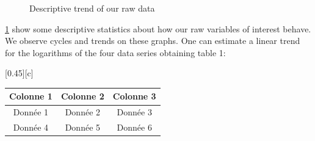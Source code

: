 \documentclass[12pt]{article}
\begin{document}
\begin{figure}
    \caption{Descriptive trend of our raw data}
    \label{fig:descriptive}
  \end{figure}

\ref{fig:descriptive} show some descriptive statistics about how our raw variables of interest behave. 
We observe cycles and trends on these graphs. One can estimate a linear trend for the logarithms of the four data series obtaining table 1:



[0.45\textwidth][c]{%
\begin{tabular}{ccc}
  \toprule
  Colonne 1 & Colonne 2 & Colonne 3 \\
  \midrule
  Donnée 1 & Donnée 2 & Donnée 3 \\
  Donnée 4 & Donnée 5 & Donnée 6 \\
  \bottomrule
\end{tabular}%
}
\end{document}
